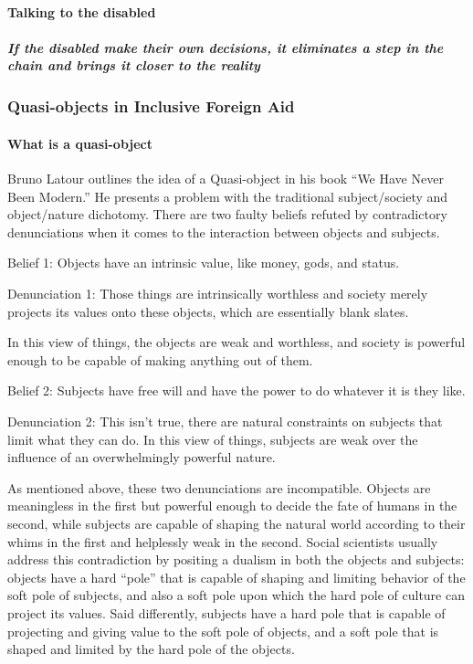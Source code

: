 \documentclass{lps}
\begin{document}
\paragraph{Talking to the disabled}

\subparagraph{If the disabled make their own decisions, it eliminates a step
in the chain and brings it closer to the reality}

\subsubsection{Quasi-objects in Inclusive Foreign Aid}

\paragraph{What is a quasi-object}

Bruno Latour outlines the idea of a Quasi-object in his book “We Have Never
Been Modern.” He presents a problem with the traditional subject/society and
object/nature dichotomy. There are two faulty beliefs refuted by contradictory
denunciations when it comes to the interaction between objects and subjects. 

Belief 1: Objects have an intrinsic value, like money, gods, and status. 

Denunciation 1: Those things are intrinsically worthless and society merely
projects its values onto these objects, which are essentially blank slates.

In this view of things, the objects are weak and worthless, and society is
powerful enough to be capable of making anything out of them.

Belief 2: Subjects have free will and have the power to do whatever it is they
like.

Denunciation 2: This isn’t true, there are natural constraints on subjects
that limit what they can do.  In this view of things, subjects are weak over
the influence of an overwhelmingly powerful nature.

As mentioned above, these two denunciations are incompatible. Objects are
meaningless in the first but powerful enough to decide the fate of humans in
the second, while subjects are capable of shaping the natural world according
to their whims in the first and helplessly weak in the second. Social
scientists usually address this contradiction by positing a dualism in both
the objects and subjects: objects have a hard “pole” that is capable of
shaping and limiting behavior of the soft pole of subjects, and also a soft
pole upon which the hard pole of culture can project its values. Said
differently, subjects have a hard pole that is capable of projecting and
giving value to the soft pole of objects, and a soft pole that is shaped and
limited by the hard pole of the objects.
\end{document}
